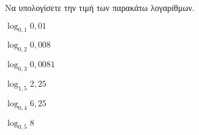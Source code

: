 Να υπολογίσετε την τιμή των παρακάτω λογαρίθμων.
\begin{multicols}{3}
\begin{rlist}[leftmargin=2mm]
\item $ \log_{0{,}1}{0{,}01} $
\item $ \log_{0{,}2}{0{,}008} $
\item $ \log_{0{,}3}{0{,}0081} $
\item $ \log_{1{,}5}{2{,}25} $
\item $ \log_{0{,}4}{6{,}25} $
\item $ \log_{0{,}5}{8} $
\end{rlist}
\end{multicols}
